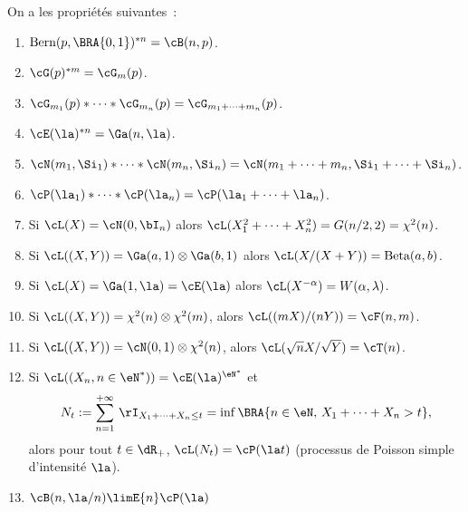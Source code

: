 On a les propriétés suivantes~:
\begin{enumerate}
\item $\textrm{Bern}(p,\BRA{0,1})^{*n}=\cB(n,p)$.
\item $\cG(p)^{*m} =  \cG_m(p)$.
\item $\cG_{m_1}(p)*\cdots*\cG_{m_n}(p) =  \cG_{m_1+\cdots+m_n}(p)$. 
\item $\cE(\la)^{*n}=\Ga(n,\la)$.
\item $\cN(m_1,\Si_1)*\cdots*\cN(m_n,\Si_n)=\cN(m_1+\cdots+m_n,\Si_1+\cdots+\Si_n)$.
\item $\cP(\la_1)*\cdots*\cP(\la_n)=\cP(\la_1+\cdots+\la_n)$.
\item Si $\cL(X)=\cN(0,\bI_n)$ alors $\cL(X_1^2+\cdots+X_n^2)=G(n/2,2)=\chi^2(n)$.
\item Si $\cL((X,Y))=\Ga(a,1)\otimes\Ga(b,1)$ alors
  $\cL(X/(X+Y))=\textrm{Beta}(a,b)$.
\item Si $\cL(X)=\Ga(1,\la)=\cE(\la)$ alors $\cL(X^{-\alpha})=W(\alpha,\lambda)$.
\item Si $\cL((X,Y))=\chi^2(n)\otimes\chi^2(m)$, alors $\cL((mX)/(nY))=\cF(n,m)$.
\item Si $\cL((X,Y))=\cN(0,1)\otimes\chi^2(n)$, alors $\cL(\sqrt{n}X/\sqrt{Y})=\cT(n)$.
\item Si $\cL((X_n,n\in\eN^*))=\cE(\la)^{\eN^*}$ et
$$
N_t:=\sum_{n=1}^{+\infty}\,\rI_{X_1+\cdots+X_n \leq t}=\inf\BRA{n\in\eN,\,X_1+\cdots+X_n>t},
$$
alors pour tout $t\in\dR_+$, $\cL(N_t)=\cP(\la t)$ (processus de Poisson
simple d'intensité $\la$).
\item $\cB(n,\la/n) \limE{n} \cP(\la)$
\end{enumerate}

